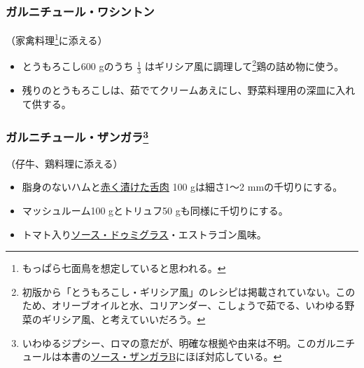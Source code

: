 \begin{recette}
\atoaki{}

\hypertarget{garniture-Washington}{%
\subsubsection{ガルニチュール・ワシントン}\label{garniture-Washington}}



（家禽料理\footnote{もっぱら七面鳥を想定していると思われる。}に添える）

\begin{itemize}
\item
  とうもろこし600 gのうち \(\frac{1}{3}\)
  はギリシア風に調理して\footnote{初版から「とうもろこし・ギリシア風」のレシピは掲載されていない。このため、オリーブオイルと水、コリアンダー、こしょうで茹でる、いわゆる野菜のギリシア風、と考えていいだろう。}鶏の詰め物に使う。
\item
  残りのとうもろこしは、茹でてクリームあえにし、野菜料理用の深皿に入れて供する。
\end{itemize}

\atoaki{}

\hypertarget{garniture-zingara}{%
\subsubsection[ガルニチュール・ザンガラ]{\texorpdfstring{ガルニチュール・ザンガラ\footnote{いわゆるジプシー、ロマの意だが、明確な根拠や由来は不明。このガルニチュールは本書の\protect\hyperlink{sauce-zingara-b}{ソース・ザンガラB}にほぼ対応している。}}{ガルニチュール・ザンガラ}}\label{garniture-zingara}}



（仔牛、鶏料理に添える）

\begin{itemize}
\item
  脂身のないハムと\protect\hyperlink{saumure-liquide-pour-langues}{赤く漬けた舌肉}
  100 gは細さ1〜2 mmの千切りにする。
\item
  マッシュルーム100 gとトリュフ50 gも同様に千切りにする。
\item
  トマト入り\protect\hyperlink{sauce-demi-glace}{ソース・ドゥミグラス}・エストラゴン風味。
\end{itemize}

 

\end{recette}
